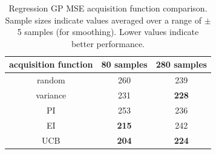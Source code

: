 \documentclass{sig-alternate}
\begin{document}
\begin{table}[tb]
\caption{Regression GP MSE acquisition function comparison.
Sample sizes indicate values averaged over a range of $\pm$5 samples (for smoothing).
Lower values indicate better performance.}
\centering
\begin{tabular}{|c|c|c|}
\hline
acquisition function & 80 samples   & 280 samples  \\ \hline
random               & 260          & 239          \\ \hline
variance             & 231          & \textbf{228} \\ \hline
PI                   & 253          & 236          \\ \hline
EI                   & \textbf{215} & 242          \\ \hline
UCB                  & \textbf{204} & \textbf{224} \\ \hline
\end{tabular}
\label{tab:reg_res}
\end{table}
\end{document}
